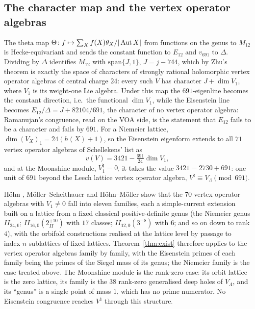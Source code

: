\documentclass[11pt]{amsart}
\theoremstyle{definition}
\begin{document}
\subsection{The character map and the vertex operator algebras} The theta map $\Theta\colon f\mapsto\sum_Xf(X)\theta_X/|\operatorname{Aut} X|$ from functions on the genus to $M_{12}$ is Hecke-equivariant and sends the constant function to $E_{12}$ and $v_{691}$ to $\Delta$. Dividing by $\Delta$ identifies $M_{12}$ with $\mathrm{span}\{J,1\}$, $J=j-744$, which by Zhu's theorem is exactly the space of characters of strongly rational holomorphic vertex operator algebras of central charge $24$: every such $V$ has character $J+\dim V_1$, where $V_1$ is its weight-one Lie algebra. Under this map the $691$-eigenline becomes the constant direction, i.e.\ the functional $\dim V_1$, while the Eisenstein line becomes $E_{12}/\Delta=J+82104/691$, the character of no vertex operator algebra: Ramanujan's congruence, read on the VOA side, is the statement that $E_{12}$ fails to be a character and fails by $691$. For a Niemeier lattice, $\dim(V_X)_1=24(h(X)+1)$, so the Eisenstein eigenform extends to all $71$ vertex operator algebras of Schellekens' list as
\[v(V)=3421-\tfrac{691}{24}\dim V_1,\]
and at the Moonshine module, $V_1^\natural=0$, it takes the value $3421=2730+691$: one unit of $691$ beyond the Leech lattice vertex operator algebra, $V^\natural\equiv V_\Lambda\pmod{691}$.

Höhn \cite{Hohn17}, Möller--Scheithauer \cite{MS23} and Höhn--Möller \cite{HM} show that the $70$ vertex operator algebras with $V_1\neq0$ fall into eleven families, each a simple-current extension built on a lattice from a fixed classical positive-definite genus (the Niemeier genus $II_{24,0}$; $II_{16,0}(2_{II}^{+10})$ with $17$ classes; $II_{12,0}(3^{-8})$ with $6$; and so on down to rank $4$), with the orbifold constructions realised at the lattice level by passage to index-$n$ sublattices of fixed lattices. Theorem~\ref{thm:exist} therefore applies to the vertex operator algebras family by family, with the Eisenstein primes of each family being the primes of the Siegel mass of its genus; the Niemeier family is the case treated above. The Moonshine module is the rank-zero case: its orbit lattice is the zero lattice, its family is the $38$ rank-zero generalised deep holes of $V_\Lambda$, and its ``genus'' is a single point of mass $1$, which has no prime numerator. No Eisenstein congruence reaches $V^\natural$ through this structure.
\end{document}
